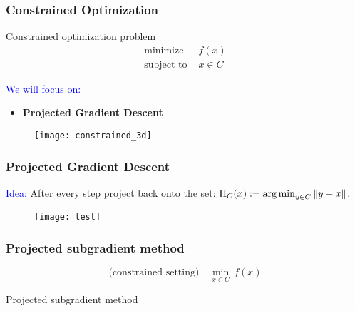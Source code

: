 \documentclass{beamer}
\begin{document}
\begin{frame}
  \frametitle{Constrained Optimization}

  \begin{minipage}{0.5\textwidth}
    \begin{block}{Constrained optimization problem}
      \begin{equation}
        \begin{aligned}
          \text{minimize } & f(x)\\
          \text{subject to } & x\in C
        \end{aligned}
      \end{equation}
      \end{block}
      \textcolor{blue}{We will focus on:}
      \begin{itemize}
        \item \textbf{Projected Gradient Descent}
      \end{itemize}
  \end{minipage}
  \begin{minipage}{0.45\textwidth}
    \begin{figure}[ht]
      \centering
      \texttt{[image: constrained\_3d]}
    \end{figure}
  \end{minipage}
\end{frame}


\begin{frame}
  \frametitle{Projected Gradient Descent}

  \textcolor{blue}{Idea:} After every step project back onto the set: $\Pi_C(x) :=\operatorname*{arg\,min}_{y\in C} \Vert y-x \Vert$.

    \begin{figure}[ht]
      \centering
      \texttt{[image: test]}
    \end{figure}

\end{frame}


\begin{frame}
  \frametitle{Projected subgradient method}
  \begin{equation}
    \text{(constrained setting)} \quad \min_{x\in C}\, f(x)
  \end{equation}
  \begin{algorithm}[H]
    \caption{Projected subgradient method}\label{label:}
    \begin{algorithmic}[1]
      \EndFor
    \end{algorithmic}
  \end{algorithm}
\end{frame}
\end{document}
